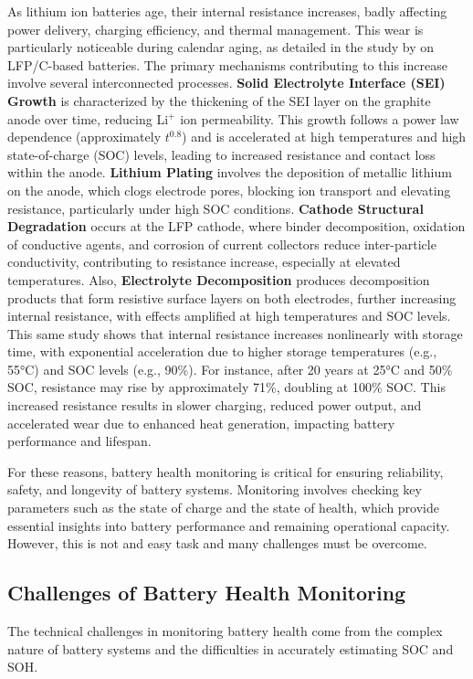 As lithium ion batteries age, their internal resistance increases, badly affecting power delivery, charging efficiency, and thermal management. This wear is particularly noticeable during calendar aging, as detailed in the study by \cite{stroe_degradation_2018} on LFP/C-based batteries. The primary mechanisms contributing to this increase involve several interconnected processes. \textbf{Solid Electrolyte Interface (SEI) Growth} is characterized by the thickening of the SEI layer on the graphite anode over time, reducing Li$^+$ ion permeability. This growth follows a power law dependence (approximately $t^{0.8}$) and is accelerated at high temperatures and high state-of-charge (SOC) levels, leading to increased resistance and contact loss within the anode. \textbf{Lithium Plating} involves the deposition of metallic lithium on the anode, which clogs electrode pores, blocking ion transport and elevating resistance, particularly under high SOC conditions. \textbf{Cathode Structural Degradation} occurs at the LFP cathode, where binder decomposition, oxidation of conductive agents, and corrosion of current collectors reduce inter-particle conductivity, contributing to resistance increase, especially at elevated temperatures. Also, \textbf{Electrolyte Decomposition} produces decomposition products that form resistive surface layers on both electrodes, further increasing internal resistance, with effects amplified at high temperatures and SOC levels. This same study shows that internal resistance increases nonlinearly with storage time, with exponential acceleration due to higher storage temperatures (e.g., 55°C) and SOC levels (e.g., 90\%). For instance, after 20 years at 25°C and 50\% SOC, resistance may rise by approximately 71\%, doubling at 100\% SOC. This increased resistance results in slower charging, reduced power output, and accelerated wear due to enhanced heat generation, impacting battery performance and lifespan.

For these reasons, battery health monitoring is critical for ensuring reliability, safety, and longevity of battery systems. Monitoring involves checking key parameters such as the state of charge and the state of health, which provide essential insights into battery performance and remaining operational capacity. However, this is not and easy task and many challenges must be overcome. 



\subsection{Challenges of Battery Health Monitoring}
The technical challenges in monitoring battery health come from the complex nature of battery systems and the difficulties in accurately estimating SOC and SOH.

